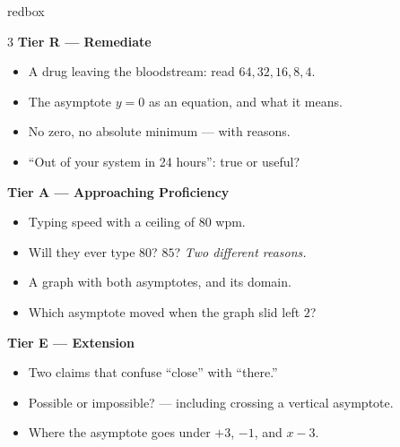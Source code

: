\documentclass[10pt]{article}
\begin{document}
\boxguard
\begin{skillbox}{redbox}
\begin{multicols}{3}
\textbf{Tier R --- Remediate}
\begin{itemize}[leftmargin=1em, itemsep=1pt, topsep=2pt]
  \item A drug leaving the bloodstream: read $64, 32, 16, 8, 4$.
  \item The asymptote $y=0$ as an equation, and what it means.
  \item No zero, no absolute minimum --- with reasons.
  \item ``Out of your system in 24 hours'': true or useful?
\end{itemize}

\columnbreak
\textbf{Tier A --- Approaching Proficiency}
\begin{itemize}[leftmargin=1em, itemsep=1pt, topsep=2pt]
  \item Typing speed with a ceiling of $80$ wpm.
  \item Will they ever type $80$? $85$? \emph{Two different reasons.}
  \item A graph with both asymptotes, and its domain.
  \item Which asymptote moved when the graph slid left $2$?
\end{itemize}

\columnbreak
\textbf{Tier E --- Extension}
\begin{itemize}[leftmargin=1em, itemsep=1pt, topsep=2pt]
  \item Two claims that confuse ``close'' with ``there.''
  \item Possible or impossible? --- including crossing a vertical asymptote.
  \item Where the asymptote goes under $+3$, $-1$, and $x-3$.
\end{itemize}
\end{multicols}
\end{skillbox}
\end{document}
